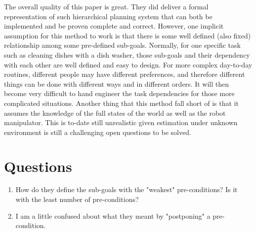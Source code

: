 \documentclass[10pt, twocolumn]{article}
\begin{document}
The overall quality of this paper is great. They did deliver a formal representation
of such hierarchical planning system that can both be implemented and be proven
complete and correct. However, one implicit assumption for this method to work
is that there is some well defined (also fixed) relationship among some pre-defined
sub-goals. Normally, for one specific task such as cleaning dishes with a dish
washer, those sub-goals and their dependency with each other are well defined
and easy to design. For more complex day-to-day routines, different people
may have different preferences, and therefore different things can be done
with different ways and in different orders. It will then become very difficult
to hand engineer the task dependencies for those more complicated situations.
Another thing that this method fall short of is that it assumes the knowledge
of the full states of the world as well as the robot manipulator. This is
to-date still unrealistic given estimation under unknown environment is
still a challenging open questions to be solved.

\section{Questions}
\begin{enumerate}
  \item How do they define the sub-goals with the "weakest" pre-conditions? Is
    it with the least number of pre-conditions?
  \item I am a little confused about what they meant by "postponing" a pre-condition.
\end{enumerate}
\end{document}
